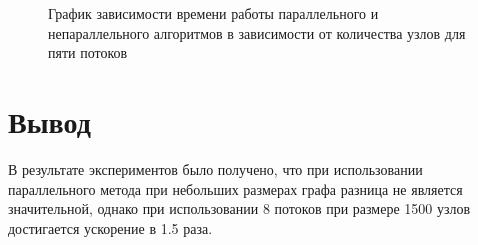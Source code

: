 \begin{figure}[H]
	\caption{График зависимости времени работы параллельного и непараллельного алгоритмов в зависимости от количества узлов для пяти потоков}
	\label{fig:res_thr_8}
\end{figure}

\section{Вывод}
В результате экспериментов было получено, что при использовании параллельного метода при небольших размерах графа разница не является значительной, однако при использовании 8 потоков при размере 1500 узлов достигается ускорение в 1.5 раза.